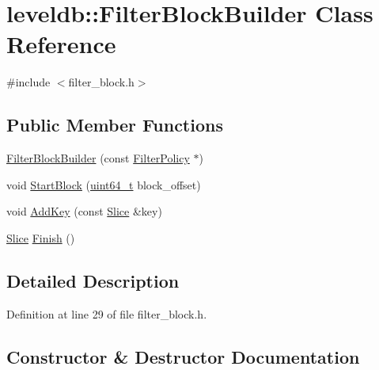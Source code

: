 \hypertarget{classleveldb_1_1_filter_block_builder}{}\section{leveldb\+:\+:Filter\+Block\+Builder Class Reference}
\label{classleveldb_1_1_filter_block_builder}


{\ttfamily \#include $<$filter\+\_\+block.\+h$>$}

\subsection*{Public Member Functions}
\begin{DoxyCompactItemize}
\item 
\hyperlink{classleveldb_1_1_filter_block_builder_a8e8b5ae95df5a13c035bec85e22549ca}{Filter\+Block\+Builder} (const \hyperlink{classleveldb_1_1_filter_policy}{Filter\+Policy} $\ast$)
\item 
void \hyperlink{classleveldb_1_1_filter_block_builder_a766a753a200f7386196a68897e47c1c3}{Start\+Block} (\hyperlink{stdint_8h_aaa5d1cd013383c889537491c3cfd9aad}{uint64\+\_\+t} block\+\_\+offset)
\item 
void \hyperlink{classleveldb_1_1_filter_block_builder_a4fd9db735c5c72973cec62e4fd98137d}{Add\+Key} (const \hyperlink{classleveldb_1_1_slice}{Slice} \&key)
\item 
\hyperlink{classleveldb_1_1_slice}{Slice} \hyperlink{classleveldb_1_1_filter_block_builder_a75fa127d8af42e749abdd235eed97cad}{Finish} ()
\end{DoxyCompactItemize}


\subsection{Detailed Description}


Definition at line 29 of file filter\+\_\+block.\+h.



\subsection{Constructor \& Destructor Documentation}
\hypertarget{classleveldb_1_1_filter_block_builder_a8e8b5ae95df5a13c035bec85e22549ca}{}

